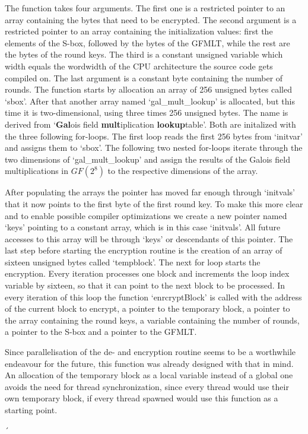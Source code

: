 The function takes four arguments. The first one is a restricted pointer
to an array containing the bytes that need to be encrypted. The second
argument is a restricted pointer to an array containing the
initialization values: first the elements of the S-box, followed by the
bytes of the GFMLT, while the rest are the bytes of the round keys. The
third is a constant unsigned variable which width equals the wordwidth
of the CPU architecture the source code gets compiled on. The last
argument is a constant byte containing the number of rounds. The
function starts by allocation an array of 256 unsigned bytes called
`sbox'. After that another array named `gal\_mult\_lookup' is allocated,
but this time it is two-dimensional, using three times 256 unsigned
bytes. The name is derived from `\textbf{Gal}ois field
\textbf{mult}iplication \textbf{lookup}table'. Both are initalized with
the three following for-loops. The first loop reads the first 256 bytes
from `initvar' and assigns them to `sbox'. The following two nested
for-loops iterate through the two dimensions of `gal\_mult\_lookup' and
assign the results of the Galois field multiplications in $GF(2^{8})$ to the
respective dimensions of the array.

After populating the arrays the pointer has moved far enough through
`initvals' that it now points to the first byte of the first round key.
To make this more clear and to enable possible compiler optimizations we
create a new pointer named `keys' pointing to a constant array, which is
in this case `initvals'. All future accesses to this array will be
through `keys' or descendants of this pointer. The last step before
starting the encryption routine is the creation of an array of sixteen
unsigned bytes called `tempblock'. The next for loop starts the
encryption. Every iteration processes one block and increments the loop
index variable by sixteen, so that it can point to the next block to be
processed. In every iteration of this loop the function `enrcryptBlock'
is called with the address of the current block to encrypt, a pointer to
the temporary block, a pointer to the array containing the round keys, a
variable containing the number of rounds, a pointer to the S-box and a
pointer to the GFMLT.

Since parallelisation of the de- and encryption routine seems to be a
worthwhile endeavour for the future, this function was already designed
with that in mind. An allocation of the temporary block as a local
variable instead of a global one avoids the need for thread
synchronization, since every thread would use their own temporary block,
if every thread spawned would use this function as a starting point.


´

